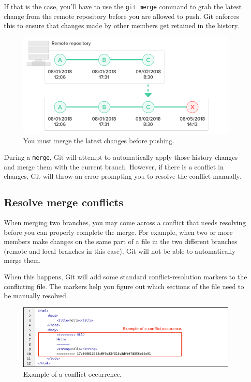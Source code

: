 \documentclass[10pt,a4paper,english]{report}
\begin{document}
    If that is the case, you'll have to use the \verb|git merge| command to grab the latest change from the remote repository before you are allowed to push. Git enforces this to ensure that changes made by other members get retained in the history.

    \begin{figure}[ht]
    \begin{center}
    \includegraphics[scale=0.5]{images/syncing_repositories_004.png}
    \end{center}
    \caption{You must merge the latest changes before pushing.}
    \end{figure}

    During a \verb"merge", Git will attempt to automatically apply those history changes and merge them with the current branch. However, if there is a conflict in changes, Git will throw an error prompting you to resolve the conflict manually.

    \subsection{Resolve merge conflicts}

    When merging two branches, you may come across a conflict that needs resolving before you can properly complete the merge. For example, when two or more members make changes on the same part of a file in the two different branches (remote and local branches in this case), Git will not be able to automatically merge them.

    When this happens, Git will add some standard conflict-resolution markers to the conflicting file. The markers help you figure out which sections of the file need to be manually resolved.

    \begin{figure}[ht]
    \begin{center}
    \includegraphics[scale=0.5]{images/syncing_repositories_005.png}
    \end{center}
    \caption{Example of a conflict occurrence.}
    \end{figure}
\end{document}
